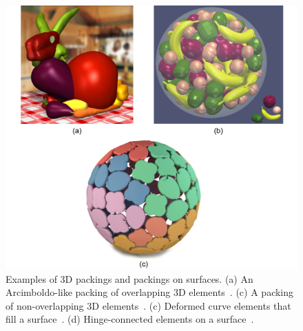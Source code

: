 \begin{figure}
\centering
\includegraphics[width=1.0\textwidth]{figures/related/gal_ma_chen.pdf} 
\caption[Examples of 3D packings and packings on surfaces]
{\label{fig_related_gal_ma_chen} 
\nnewtext
{
Examples of 3D packings and packings on surfaces.
(a) An Arcimboldo-like packing of overlapping 3D elements~\cite{Gal2007B}. 
(c) A packing of non-overlapping 3D elements~\cite{Ma2018}.
(c) Deformed curve elements that fill a surface~\cite{Zehnder2016}.
(d) Hinge-connected elements on a surface~\cite{Chen2017}.
}
}
\end{figure}

